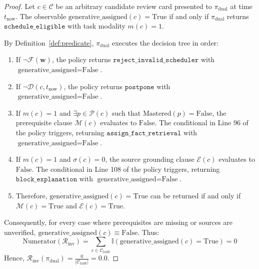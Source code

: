 \documentclass[11pt,a4paper]{article}
\begin{document}
\begin{proof}
Let $c \in \mathcal{C}$ be an arbitrary candidate review card presented to $\pi_{\text{dual}}$ at time $t_{\text{now}}$. The observable $\text{generative\_assigned}(c) = \text{True}$ if and only if $\pi_{\text{dual}}$ returns $\texttt{schedule\_eligible}$ with task modality $m(c) = 1$.

By Definition~\ref{def:predicate}, $\pi_{\text{dual}}$ executes the decision tree in order:
\begin{enumerate}
    \item If $\neg\mathcal{F}(\mathbf{w})$, the policy returns $\texttt{reject\_invalid\_scheduler}$ with $\text{generative\_assigned} = \text{False}$.
    \item If $\neg\mathcal{D}(c, t_{\text{now}})$, the policy returns $\texttt{postpone}$ with $\text{generative\_assigned} = \text{False}$.
    \item If $m(c)=1$ and $\exists p \in \mathcal{P}(c)$ such that $\text{Mastered}(p) = \text{False}$, the prerequisite clause $\mathcal{M}(c)$ evaluates to $\text{False}$. The conditional in Line 96 of the policy triggers, returning $\texttt{assign\_fact\_retrieval}$ with $\text{generative\_assigned} = \text{False}$.
    \item If $m(c)=1$ and $\sigma(c) = 0$, the source grounding clause $\mathcal{E}(c)$ evaluates to $\text{False}$. The conditional in Line 108 of the policy triggers, returning $\texttt{block\_explanation}$ with $\text{generative\_assigned} = \text{False}$.
    \item Therefore, $\text{generative\_assigned}(c) = \text{True}$ can be returned if and only if $\mathcal{M}(c) = \text{True}$ and $\mathcal{E}(c) = \text{True}$.
\end{enumerate}
Consequently, for every case where prerequisites are missing or sources are unverified, $\text{generative\_assigned}(c) \equiv \text{False}$. Thus:
\begin{equation}
    \text{Numerator}(\mathcal{R}_{\text{inv}}) = \sum_{c \in \mathcal{C}_{\text{fault}}} \mathbb{I}(\text{generative\_assigned}(c) = \text{True}) = 0
\end{equation}
Hence, $\mathcal{R}_{\text{inv}}(\pi_{\text{dual}}) = \frac{0}{|\mathcal{C}_{\text{fault}}|} = 0.0$.
\end{proof}
\end{document}
